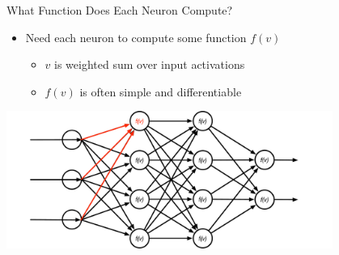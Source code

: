\documentclass[aspectratio=169]{beamer}
\begin{document}
\begin{frame}{What Function Does Each Neuron Compute?}

\begin{itemize}
	\item Need each neuron to compute some function $f(v)$
	\begin{itemize}
		\item $v$ is weighted sum over input activations
		\item $f(v)$ is often simple and differentiable
	\end{itemize}
\end{itemize}

\includegraphics[width=0.8\textwidth]{lectFF/nnFV.pdf}
\end{frame}
\end{document}
